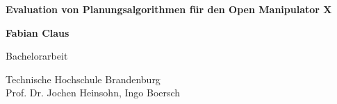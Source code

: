 \begin{titlepage}
    \begin{center}
        \vspace*{1cm}
            
        \Huge
        \textbf{Evaluation von Planungsalgorithmen für den Open Manipulator X}
            
        \vspace{0.5cm}
        \LARGE
        
            
        \vspace{1.5cm}
            
        \textbf{Fabian Claus}\\
            
        \vfill
            
       Bachelorarbeit
            
        \vspace{0.8cm}
            
            
        \Large
        Technische Hochschule Brandenburg\\
        Prof. Dr. Jochen Heinsohn, Ingo Boersch\\
            
    \end{center}
\end{titlepage}